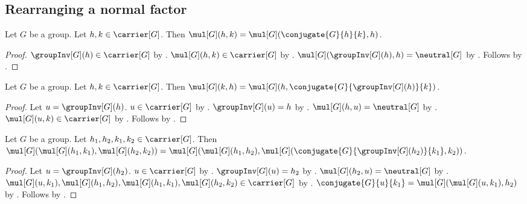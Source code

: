 \subsection{Rearranging a normal factor}

\begin{lemma}\label{subgroup_product_swap_right_factor}
    Let $G$ be a group.
    Let $h,k\in\carrier[G]$.
    Then
        $\mul[G](h,k)=
            \mul[G](\conjugate{G}{h}{k},h)$.
\end{lemma}
\begin{proof}
    $\groupInv[G](h)\in\carrier[G]$ by
        .
    $\mul[G](h,k)\in\carrier[G]$ by
        .
    $\mul[G](\groupInv[G](h),h)=\neutral[G]$ by
        .
    Follows by
        .
\end{proof}

\begin{lemma}\label{subgroup_product_swap_left_factor}
    Let $G$ be a group.
    Let $h,k\in\carrier[G]$.
    Then
        $\mul[G](k,h)=
            \mul[G]
                (h,\conjugate{G}{\groupInv[G](h)}{k})$.
\end{lemma}
\begin{proof}
    Let $u=\groupInv[G](h)$.
    $u\in\carrier[G]$ by .
    $\groupInv[G](u)=h$ by .
    $\mul[G](h,u)=\neutral[G]$ by
        .
    $\mul[G](u,k)\in\carrier[G]$ by
        .
    Follows by
        .
\end{proof}

\begin{lemma}\label{subgroup_product_mul_rearrangement}
    Let $G$ be a group.
    Let $h_1,h_2,k_1,k_2\in\carrier[G]$.
    Then
        $\mul[G](\mul[G](h_1,k_1),\mul[G](h_2,k_2))=
            \mul[G]
                (\mul[G](h_1,h_2),
                 \mul[G]
                    (\conjugate{G}{\groupInv[G](h_2)}{k_1},k_2))$.
\end{lemma}
\begin{proof}
    Let $u=\groupInv[G](h_2)$.
    $u\in\carrier[G]$ by .
    $\groupInv[G](u)=h_2$ by .
    $\mul[G](h_2,u)=\neutral[G]$ by
        .
    $\mul[G](u,k_1),\mul[G](h_1,h_2),
        \mul[G](h_1,k_1),\mul[G](h_2,k_2)\in\carrier[G]$ by
        .
    $\conjugate{G}{u}{k_1}=\mul[G](\mul[G](u,k_1),h_2)$ by
        .
    Follows by
        .
\end{proof}

